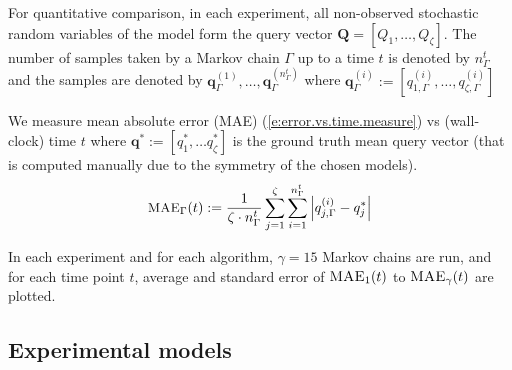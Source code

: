 \documentclass{article} %
\newcommand{\bvec}[1]{\textbf{#1}}
\begin{document}
For quantitative comparison,  
in each experiment, all non-observed stochastic random variables of the model  form the query vector $\bvec{Q} = [Q_1, \ldots, Q_\zeta]$.
The number of samples taken by a Markov chain $\Gamma$ up to a time $t$ is denoted by $n_{\Gamma}^t$ and  
the samples are denoted by 
$\bvec{q}_\Gamma^{(1)}, \ldots, \bvec{q}^{(n_{\Gamma}^t)}_\Gamma$
where $\bvec{q}_\Gamma^{(i)} := 
[q_{1, \Gamma}^{(i)} , \ldots, q_{\zeta, \Gamma}^{(i)}]$

We measure mean absolute error (MAE) (\ref{e:error.vs.time.measure}) vs (wall-clock) time $t$ where 
$\bvec{q}^* := [q_1^*, \ldots q_\zeta^*]$ 
is the ground truth mean query vector (that is computed manually due to the symmetry of the chosen models).
\begin{equation}\footnotesize
\label{e:error.vs.time.measure}
\textsc{MAE}_{\Gamma}(t) := \frac{1}{\zeta \cdot n_\Gamma^t} 
\sum_{j=1}^{\zeta}
\sum_{i=1}^{n_\Gamma^t}
\left|{q}^{(i)}_{j, \Gamma} - {q}_j^* \right|
\end{equation}


In each experiment and for each algorithm, $\gamma = 15$ Markov chains are run,  and for each time point $t$,
average and standard error of %
$\textsc{MAE}_{1}(t)$ to $\textsc{MAE}_{\gamma}(t)$
are plotted. 

\subsection{Experimental models}
\label{sect:experimental.results.models}
\end{document}
